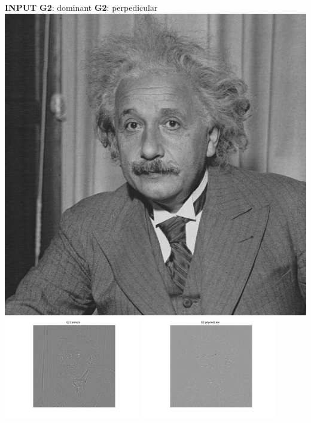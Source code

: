 \documentclass[12pt,twoside]{article}
\newcommand{\tabUnit}{3ex}
\newcommand{\tabT}{\hspace*{\tabUnit}}
\begin{document}
\tabT\tabT \textbf{INPUT}
\tabT\tabT\tabT\tabT\tabT\tabT \textbf{G2}: dominant
\tabT\tabT\tabT\tabT\tabT\tabT \textbf{G2}: perpedicular
\newline
\includegraphics[scale = .2, trim = 0pt -130pt 0pt 0pt, clip]{einstein}
\includegraphics[width = 168pt, trim = 80pt 20pt 100pt 30pt, clip]{G2d}
\includegraphics[width = 168pt, trim = 80pt 20pt 100pt 30pt, clip]{G2p}
\newline
\end{document}
